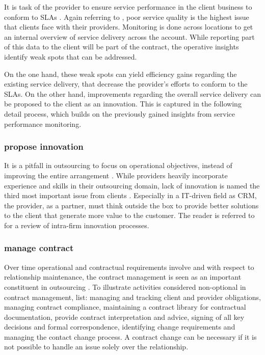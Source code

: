 	It is task of the provider to ensure service performance in the client business to conform to \acrshort{SLA}s \citep{deloittehandbook}. Again referring to \cite{deloitte2014outsourcing}, poor service quality is the highest issue that clients face with their providers. Monitoring is done across locations to get an internal overview of service delivery across the account. While reporting part of this data to the client will be part of the contract, the operative insights identify weak spots that can be addressed. 
	
	On the one hand, these weak spots can yield efficiency gains regarding the existing service delivery, that decrease the provider's efforts to conform to the \acrshort{SLA}s. On the other hand, improvements regarding the overall service delivery can be proposed to the client as an innovation. This is captured in the following detail process, which builds on the previously gained insights from service performance monitoring. 
	
	\subsubsection{propose innovation}
	
	It is a pitfall in outsourcing to focus on operational objectives, instead of improving the entire arrangement \citep{deloittehandbook}. While providers heavily incorporate experience and skills in their outsourcing domain, lack of innovation is named the third most important issue from clients \citep{deloitte2014outsourcing}. Especially in a IT-driven field as \acrshort{CRM}, the provider, as a partner, must think outside the box to provide better solutions to the client that generate more value to the customer. The reader is referred to \citep{Saren_1984} for a review of intra-firm innovation processes. 
	
	\subsubsection{manage contract}
	
	Over time operational and contractual requirements involve and with respect to relationship maintenance, the contract management is seen as an important constituent in outsourcing \citep{Franceschini_2003, perunovic2007outsourcing}. To illustrate activities considered non-optional in contract management, \citep[]{deloittehandbook} list: managing and tracking client and provider obligations, managing contract compliance, maintaining a contract library for contractual documentation, provide contract interpretation and advice, signing of all key decisions and formal correspondence, identifying change requirements and managing the contact change process. A contract change can be necessary if it is not possible to handle an issue solely over the relationship. 
	
